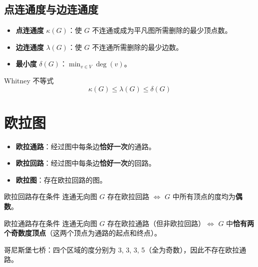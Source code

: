 \subsection{点连通度与边连通度}

\begin{mydefinition}{}
\begin{itemize}
    \item \textbf{点连通度} $\kappa(G)$：使 $G$ 不连通或成为平凡图所需删除的最少顶点数。
    \item \textbf{边连通度} $\lambda(G)$：使 $G$ 不连通所需删除的最少边数。
    \item \textbf{最小度} $\delta(G)$：$\min_{v \in V} \deg(v)$。
\end{itemize}
\end{mydefinition}

\begin{myTheorem}{Whitney 不等式}
\[
\kappa(G) \leq \lambda(G) \leq \delta(G)
\]
\end{myTheorem}

\section{欧拉图}

\begin{mydefinition}{}
\begin{itemize}
    \item \textbf{欧拉通路}：经过图中每条边\textbf{恰好一次}的通路。
    \item \textbf{欧拉回路}：经过图中每条边\textbf{恰好一次}的回路。
    \item \textbf{欧拉图}：存在欧拉回路的图。
\end{itemize}
\end{mydefinition}

\begin{myTheorem}{欧拉回路存在条件}
连通无向图 $G$ 存在欧拉回路 $\iff$ $G$ 中所有顶点的度均为\textbf{偶数}。
\end{myTheorem}

\begin{myTheorem}{欧拉通路存在条件}
连通无向图 $G$ 存在欧拉通路（但非欧拉回路）$\iff$ $G$ 中\textbf{恰有两个奇数度顶点}（这两个顶点为通路的起点和终点）。
\end{myTheorem}

\begin{example}
哥尼斯堡七桥：四个区域的度分别为 3, 3, 3, 5（全为奇数），因此不存在欧拉通路。
\end{example}

